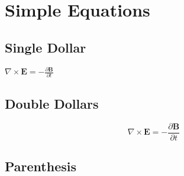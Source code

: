 \begin{comment}
\end{itemize}

\item Begin{\ldots} (\autoref{begin...})

\begin{itemize}
\item With Bracket (\autoref{withbracket})

\item Without Bracket (\autoref{withoutbracket})

\end{itemize}

\item In Comment (\autoref{incomment})

\begin{itemize}
\item In Line (\autoref{inline})

\item Fenced (\autoref{fenced})

\item Fenced With Language (\autoref{fencedwithlanguage})

\end{itemize}

\end{itemize}

 \end{comment} 

\chapter{Simple Equations}
\label{simpleequations}

\section{Single Dollar}
\label{singledollar}

$\nabla \times \mathbf{E} = - \frac{\partial \mathbf{B}}{\partial t}$

\section{Double Dollars}
\label{doubledollars}

$$\nabla \times \mathbf{E} = - \frac{\partial \mathbf{B}}{\partial t}$$

\section{Parenthesis}
\label{parenthesis}

